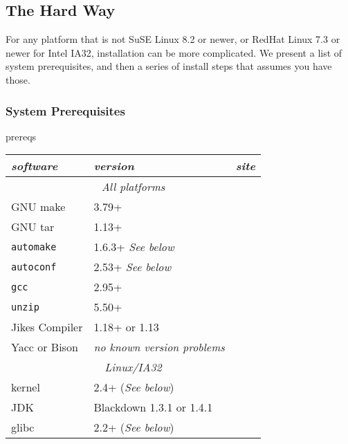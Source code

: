 \subsection{The Hard Way}

 For any platform that is not SuSE Linux 8.2 or newer, or RedHat Linux 7.3 or newer for Intel
IA32, installation can be more complicated.  We present a list of system
prerequisites, and then a series of install steps that assumes you
have those.

\subsubsection{System Prerequisites}

\begin{Label}{prereqs}

\begin{table}[h]
\begin{center}
\begin{tabular}{|l|l|l|} \hline\hline
{\em software} & {\em version} & {\em site} \\ \hline
\multicolumn{3}{|c|}{\em All platforms}                     \\ \hline
GNU make       & 3.79+    & \xlink{\tt \makeURL}{\makeURL}         \\ 
GNU tar        & 1.13+    & \xlink{\tt \tarURL}{\tarURL}           \\ 
{\tt automake}       & 1.6.3+ {{\em See below}}  & \xlink{\tt \automakeURL}{\automakeURL} \\
{\tt autoconf}       & 2.53+  {{\em See below}}  & \xlink{\tt \autoconfURL}{\autoconfURL} \\
{\tt gcc}            & 2.95+    & \xlink{\tt \gccURL}{\gccURL}           \\
{\tt unzip}          & 5.50+    & \xlink{\tt \unzipURL}{\unzipURL}       \\
Jikes Compiler & 1.18+ or 1.13 & \xlink{\tt \jikesURL}{\jikesURL}       \\
\hline
Yacc or Bison &	{\it no known version problems} &			\\
\multicolumn{3}{|c|}{\em Linux/IA32}                      \\ \hline
kernel         & 2.4+ ({\em See below}) & \xlink{\tt \linuxKernelURL}{\linuxKernelURL} \\
JDK            & Blackdown 1.3.1 or 1.4.1 & \xlink{\tt \BlackdownURL}{\BlackdownURL} \\
glibc          & 2.2+ ({\em See below}) & \xlink{\tt \glibcURL}{\glibcURL} \\ \hline

\end{tabular}
\end{center}
\end{table}
\end{Label}
